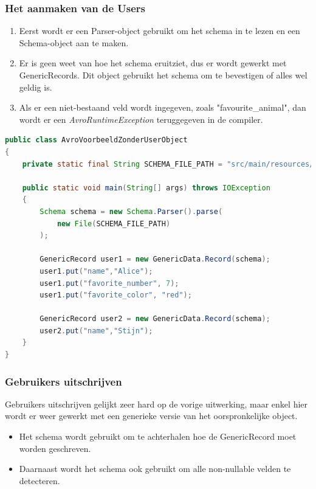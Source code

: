 \documentclass[a4paper,10pt,twoside]{report}
\begin{document}
\subsubsection{Het aanmaken van de Users}

\begin{enumerate}
	\item Eerst wordt er een Parser-object gebruikt om het schema in te lezen en een Schema-object aan te maken.
	\item Er is geen weet van hoe het schema eruitziet, dus er wordt gewerkt met GenericRecords. Dit object gebruikt het schema om te bevestigen of alles wel geldig is.
	\item Als er een niet-bestaand veld wordt ingegeven, zoals "favourite\_animal", dan wordt er een \textit{AvroRuntimeException} teruggegeven in de compiler.
\end{enumerate}

\begin{lstlisting}[language=Java]
public class AvroVoorbeeldZonderUserObject 
{
	private static final String SCHEMA_FILE_PATH = "src/main/resources/avro/Users.avsc";
	
	public static void main(String[] args) throws IOException
	{
		Schema schema = new Schema.Parser().parse(
			new File(SCHEMA_FILE_PATH)
		);
		
		GenericRecord user1 = new GenericData.Record(schema);
		user1.put("name","Alice");
		user1.put("favorite_number", 7);
		user1.put("favorite_color", "red");
		
		GenericRecord user2 = new GenericData.Record(schema);
		user2.put("name","Stijn");
	}
}
\end{lstlisting}

\subsubsection{Gebruikers uitschrijven}

Gebruikers uitschrijven gelijkt zeer hard op de vorige uitwerking, maar enkel hier wordt er weer gewerkt met een generieke versie van het oorspronkelijke object. 

\begin{itemize}
	\item Het schema wordt gebruikt om te achterhalen hoe de GenericRecord moet worden geschreven. 
	\item Daarnaast wordt het schema ook gebruikt om alle non-nullable velden te detecteren.
\end{itemize}
\end{document}
